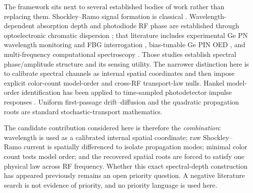 \documentclass[11pt]{article}
\begin{document}
The framework sits next to several established bodies of work rather than replacing them. Shockley--Ramo signal formation is classical \cite{Shockley1938,Ramo1939,Dabrowski1989}. Wavelength-dependent absorption depth and photodiode RF phase are established through optoelectronic chromatic dispersion \cite{Glasser2021}; that literature includes experimental Ge PN wavelength monitoring and FBG interrogation \cite{Liokumovitch2021}, bias-tunable Ge PIN OED \cite{Dutta2024}, and multi-frequency computational spectroscopy \cite{Kassa2026}. Those studies establish spectral phase/amplitude structure and its sensing utility. The narrower distinction here is to calibrate spectral channels as internal spatial coordinates and then impose explicit color-count model-order and cross-RF transport-law nulls. Hankel model-order identification has been applied to time-sampled photodetector impulse responses \cite{Sun2025}. Uniform first-passage drift--diffusion and the quadratic propagation roots are standard stochastic-transport mathematics.

The candidate contribution considered here is therefore the \emph{combination}: wavelength is used as a calibrated internal spatial coordinate; raw Shockley--Ramo current is spatially differenced to isolate propagation modes; minimal color count tests model order; and the recovered spatial roots are forced to satisfy one physical law across RF frequency. Whether this exact spectral-depth construction has appeared previously remains an open priority question. A negative literature search is not evidence of priority, and no priority language is used here.
\end{document}
